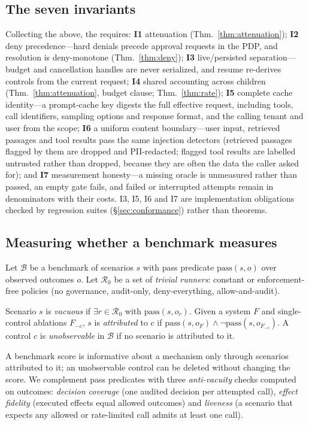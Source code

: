 \subsection{The seven invariants}
Collecting the above, the \gec{} requires: \textbf{I1} attenuation (Thm.~\ref{thm:attenuation}); \textbf{I2} deny precedence---hard denials precede approval requests in the PDP, and resolution is deny-monotone (Thm.~\ref{thm:deny}); \textbf{I3} live/persisted separation---budget and cancellation handles are never serialized, and resume re-derives controls from the current request; \textbf{I4} shared accounting across children (Thm.~\ref{thm:attenuation}, budget clause; Thm.~\ref{thm:rate}); \textbf{I5} complete cache identity---a prompt-cache key digests the full effective request, including tools, call identifiers, sampling options and response format, and the calling tenant and user from the scope; \textbf{I6} a uniform content boundary---user input, retrieved passages and tool results pass the same injection detectors (retrieved passages flagged by them are dropped and PII-redacted; flagged tool results are labelled untrusted rather than dropped, because they are often the data the caller asked for); and \textbf{I7} measurement honesty---a missing oracle is unmeasured rather than passed, an empty gate fails, and failed or interrupted attempts remain in denominators with their costs. I3, I5, I6 and I7 are implementation obligations checked by regression suites (\S\ref{sec:conformance}) rather than theorems.

\subsection{Measuring whether a benchmark measures}
\label{sec:vacuity-def}
Let $\mathcal{B}$ be a benchmark of scenarios $s$ with pass predicate $\mathrm{pass}(s,o)$ over observed outcomes $o$. Let $\mathcal{R}_0$ be a set of \emph{trivial runners}: constant or enforcement-free policies (no governance, audit-only, deny-everything, allow-and-audit).
\begin{definition}
Scenario $s$ is \emph{vacuous} if $\exists r\in\mathcal{R}_0$ with $\mathrm{pass}(s,o_r)$. Given a system $F$ and single-control ablations $F_{-c}$, $s$ is \emph{attributed} to $c$ if $\mathrm{pass}(s,o_F)\wedge\neg\mathrm{pass}(s,o_{F_{-c}})$. A control $c$ is \emph{unobservable} in $\mathcal{B}$ if no scenario is attributed to it.
\end{definition}
A benchmark score is informative about a mechanism only through scenarios attributed to it; an unobservable control can be deleted without changing the score. We complement pass predicates with three \emph{anti-vacuity} checks computed on outcomes: \emph{decision coverage} (one audited decision per attempted call), \emph{effect fidelity} (executed effects equal allowed outcomes) and \emph{liveness} (a scenario that expects any allowed or rate-limited call admits at least one call).
